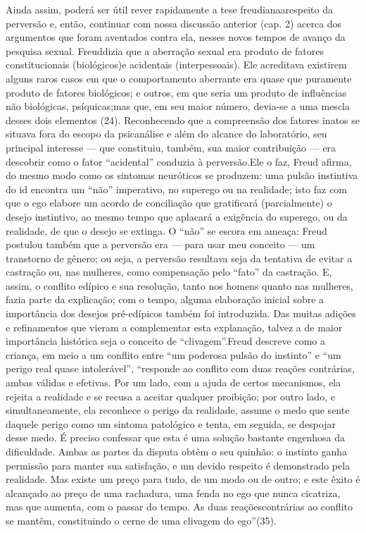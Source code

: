 Ainda assim, poderá ser útil rever rapidamente a tese freudiana\idxfreudaberr[|(] a\idxfeticfreu[|(]
respeito da perversão e, então, continuar com nossa discussão anterior
(cap. 2) acerca dos argumentos que foram aventados contra ela, nesses
novos tempos de avanço da pesquisa sexual. Freud\idxfreudfetic[|(] dizia que a aberração
sexual era produto de fatores constitucionais (biológicos)\idxaberrbiol[|(] e acidentais\idxpervacide{}
(interpessoais). Ele acreditava existirem alguns raros casos em que o
comportamento aberrante era quase que puramente produto de fatores
biológicos; e outros, em que seria um produto de influências não
biológicas, psíquicas;\idxaberrbiol[|)] mas que, em seu maior número, devia-se a uma
mescla desses dois elementos (24). Reconhecendo que a compreensão dos
fatores inatos se situava fora do escopo da psicanálise e além do
alcance do laboratório, seu principal interesse --- que constituiu,
também, sua maior contribuição --- era descobrir como o fator
``acidental'' conduzia à perversão.\idxhost[|)] Ele o
faz, Freud afirma, do mesmo modo como os sintomas neuróticos se
produzem: uma pulsão instintiva do id encontra um
``não'' imperativo, no superego ou na
realidade; isto faz com que o ego elabore um acordo de conciliação\idxacor{} que
gratificará (parcialmente) o desejo instintivo, ao mesmo tempo que
aplacará a exigência do superego, ou da realidade, de que o desejo se
extinga. O ``não'' se escora em ameaça: Freud
postulou também que a perversão era --- para usar meu conceito --- um
transtorno de gênero; ou seja, a perversão resultava seja da tentativa
de evitar a castração ou, nas mulheres, como compensação pelo
``fato'' da castração. E, assim, o conflito
edípico e sua resolução, tanto nos homens quanto nas mulheres, fazia
parte da explicação; com o tempo, alguma elaboração inicial sobre a
importância dos desejos pré-edípicos\idxconfedese{} também foi introduzida. Das muitas
adições e refinamentos que vieram a complementar esta explanação,
talvez a de maior importância histórica seja o conceito de
``clivagem''.\idxconfcliv[|(] Freud descreve como a criança,
em meio a um conflito entre ``um poderosa pulsão do
instinto'' e ``um perigo real quase
intolerável'', ``responde ao conflito com duas reações contrárias, ambas
válidas e efetivas. Por um lado, com a ajuda de certos mecanismos, ela
rejeita a realidade e se recusa a aceitar qualquer proibição; por outro
lado, e simultaneamente, ela reconhece o perigo da realidade, assume o
medo que sente daquele perigo como um sintoma patológico e tenta, em
seguida, se despojar desse medo. É preciso confessar que esta é uma
solução bastante engenhosa da dificuldade. Ambas as partes da disputa
obtêm o seu quinhão: o instinto ganha permissão para manter sua
satisfação, e um devido respeito é demonstrado pela realidade. Mas
existe um preço para tudo, de um modo ou de outro; e este êxito é
alcançado ao preço de uma rachadura, uma fenda no ego que nunca
cicatriza, mas que aumenta, com o passar do tempo. As duas reações\idxpreedi[|)]
contrárias ao conflito se mantêm, constituindo o cerne de uma clivagem
do ego''\idxcliv[|(] (35).

